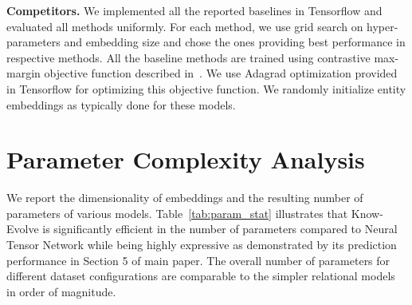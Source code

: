 \documentclass{article}
\begin{document}
{\bf Competitors.} We implemented all the reported baselines in Tensorflow and evaluated all methods uniformly. For each method, we use grid search on hyper-parameters and embedding size and chose the ones providing best performance in respective methods. All the baseline methods are trained  using contrastive max-margin objective function described in~\citep{SocCheManNg13}. We use Adagrad optimization provided in Tensorflow for optimizing this objective function. We randomly initialize entity embeddings as typically done for these models.

\section{Parameter Complexity Analysis}
\label{sec:param_comp}
We report the dimensionality of embeddings and the resulting number of parameters of various models. Table~\ref{tab:param_stat} illustrates that Know-Evolve is significantly efficient in the number of parameters compared to Neural Tensor Network while being highly expressive as demonstrated by its prediction performance in Section 5 of main paper. The overall number of parameters for different dataset configurations are comparable to the simpler relational models in order of magnitude.


\begin{table}[h!]
\caption{Comparison of our method with various relational methods for memory complexity. Last two columns provide example realizations of this complexity in full versions for GDELT and ICEWS datasets. $H_a$ and $H_b$ correspond to hidden layers used in respective methods.$H_e$ and $H_r$ correspond to entity and relation embedding dimensions respectively. $N_e$ and $N_r$ are number of entities and relations in each dataset. For GDELT, $N_e = 14018$ and $N_r = 20$. For ICEWS, $N_e = 12498$ and $N_r = 260$. We borrow the notations from~\citep{NicMurTreGab16} for simplicity.}
\label{tab:param_stat}
\end{table}
\end{document}
